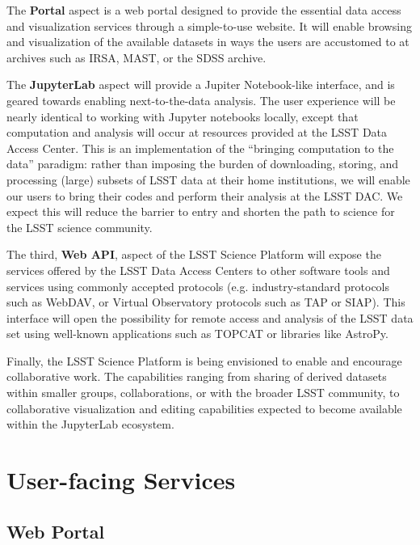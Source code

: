 \documentclass[DM,lsstdraft,toc]{lsstdoc}
\begin{document}
The {\bf Portal} aspect is a web portal designed to provide the essential data
access and visualization services through a simple-to-use website.  It will
enable browsing and visualization of the available datasets in ways the
users are accustomed to at archives such as IRSA, MAST, or the SDSS archive.

The {\bf JupyterLab} aspect will provide a Jupiter Notebook-like interface, and 
is geared towards enabling next-to-the-data analysis. The user experience will 
be nearly identical to working with Jupyter notebooks locally, except that computation
and analysis will occur at resources provided at the LSST Data Access Center.  This is an
implementation of the “bringing computation to the data” paradigm: rather
than imposing the burden of downloading, storing, and processing (large)
subsets of LSST data at their home institutions, we will enable our users to
bring their codes and perform their analysis at the LSST DAC.  We expect
this will reduce the barrier to entry and shorten the path to science for
the LSST science community.

The third, {\bf Web API}, aspect of the LSST Science Platform will expose the
services offered by the LSST Data Access Centers to other software tools and
services using commonly accepted protocols (e.g. industry-standard protocols
such as WebDAV, or Virtual Observatory protocols such as TAP or SIAP). This
interface will open the possibility for remote access and analysis of the LSST 
data set using well-known applications such as TOPCAT or libraries like AstroPy.

Finally, the LSST Science Platform is being envisioned to enable and encourage
collaborative work.  The capabilities ranging from sharing of derived
datasets within smaller groups, collaborations, or with the broader LSST
community, to collaborative visualization and editing capabilities expected
to become available within the JupyterLab ecosystem.

\section{User-facing Services}

\subsection{Web Portal}
\end{document}
